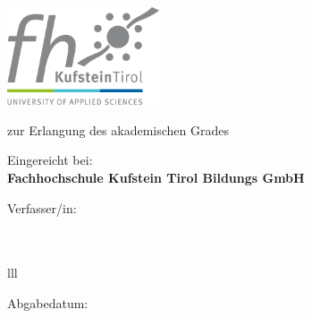 \begin{titlepage}
 
    \vfill
    \begin{center}
      \includegraphics[width=4.5cm]{img/kufstein_logo.png} \\ 
    \end{center}
    \vfill
  
    \begin{center}
      \Large \textbf{\mytitle}
    \end{center} 
    \vfill
  
    \begin{center}
      \worktype
    \end{center}
    \vfill
  
    \begin{center}
      zur Erlangung des akademischen Grades\\
      \large \textbf{\academictitle}
    \end{center}
    \vfill
  
    \begin{center}
      Eingereicht bei:\\ 
      \vspace{0.1cm}
      \large \textbf{Fachhochschule Kufstein Tirol Bildungs GmbH}\\
      \vspace{0.1cm}
      \large \textbf{\studyprogram}
    \end{center}
    \vfill
  
    \begin{center}
      Verfasser/in:\\
      \vspace{0.1cm}
      \large \textbf{\myname}\\
      \vspace{0.1cm}
      \large \textbf{\mypkz}\\
    \end{center}
    \vfill
  
    \begin{center}
      \begin{tabular}{lll}
      \end{tabular}
    \end{center} 
    \vfill
  
    \begin{center}
      Abgabedatum: \\
      \vspace{0.1cm}
      \large \textbf{\mydate}
    \end{center} 
    \vfill  
  \end{titlepage}
